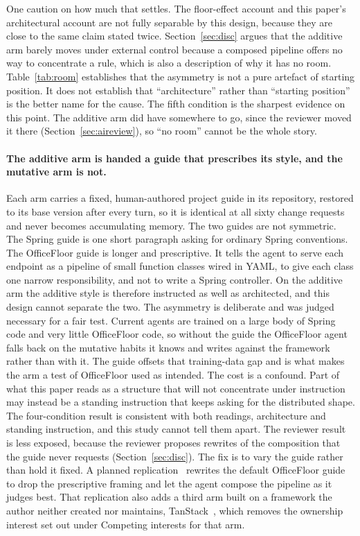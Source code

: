 \documentclass[11pt,a4paper]{article}
\begin{document}
One caution on how much that settles. The floor-effect account and this paper's
architectural account are not fully separable by this design, because they are
close to the same claim stated twice. Section~\ref{sec:disc} argues that the
additive arm barely moves under external control because a composed pipeline
offers no way to concentrate a rule, which is also a description of why it has no
room. Table~\ref{tab:room} establishes that the asymmetry is not a pure artefact
of starting position. It does not establish that ``architecture'' rather than
``starting position'' is the better name for the cause. The fifth condition is the
sharpest evidence on this point. The additive arm did have somewhere to go, since
the reviewer moved it there (Section~\ref{sec:aireview}), so ``no room'' cannot be
the whole story.

\paragraph{The additive arm is handed a guide that prescribes its style, and the
mutative arm is not.} Each arm carries a fixed, human-authored project guide in its
repository, restored to its base version after every turn, so it is identical at all
sixty change requests and never becomes accumulating memory. The two guides are not
symmetric. The Spring guide is one short paragraph asking for ordinary Spring
conventions. The OfficeFloor guide is longer and prescriptive. It tells the agent to
serve each endpoint as a pipeline of small function classes wired in YAML, to give
each class one narrow responsibility, and not to write a Spring controller. On the
additive arm the additive style is therefore instructed as well as architected, and
this design cannot separate the two. The asymmetry is deliberate and was judged
necessary for a fair test. Current agents are trained on a large body of Spring code
and very little OfficeFloor code, so without the guide the OfficeFloor agent falls
back on the mutative habits it knows and writes against the framework rather than
with it. The guide offsets that training-data gap and is what makes the arm a test of
OfficeFloor used as intended. The cost is a confound. Part of what this paper reads as
a structure that will not concentrate under instruction may instead be a standing
instruction that keeps asking for the distributed shape. The four-condition result is
consistent with both readings, architecture and standing instruction, and this study
cannot tell them apart. The reviewer result is less exposed, because the reviewer
proposes rewrites of the composition that the guide never requests
(Section~\ref{sec:disc}). The fix is to vary the guide rather than hold it fixed. A
planned replication~\cite{nextexp} rewrites the default OfficeFloor guide to drop the prescriptive
framing and let the agent compose the pipeline as it judges best. That replication
also adds a third arm built on a framework the author neither created nor maintains,
TanStack~\cite{tanstack}, which removes the ownership interest set out under Competing
interests for that arm.
\end{document}
